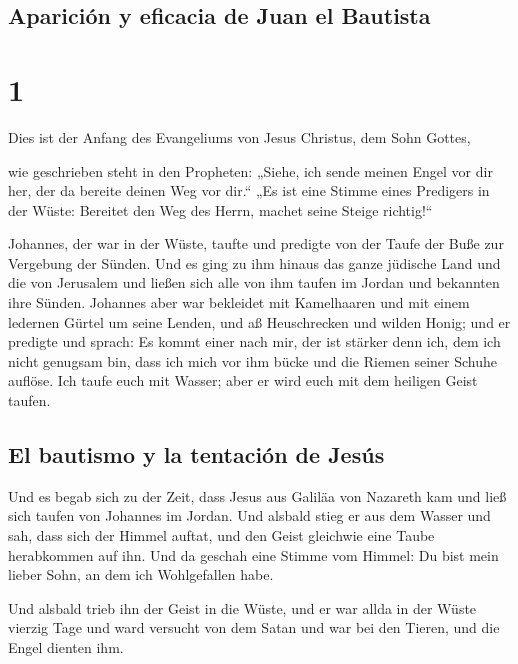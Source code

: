 \hypertarget{apariciuxf3n-y-eficacia-de-juan-el-bautista}{%
\subsection{Aparición y eficacia de Juan el
Bautista}\label{apariciuxf3n-y-eficacia-de-juan-el-bautista}}

\hypertarget{section}{%
\section{1}\label{section}}

 Dies ist der Anfang des Evangeliums von Jesus Christus,
dem Sohn Gottes,

 wie geschrieben steht in den Propheten: „Siehe, ich sende
meinen Engel vor dir her, der da bereite deinen Weg vor dir.``
 „Es ist eine Stimme eines Predigers in der Wüste:
Bereitet den Weg des Herrn, machet seine Steige richtig!{}``

 Johannes, der war in der Wüste, taufte und predigte von
der Taufe der Buße zur Vergebung der Sünden.  Und es ging
zu ihm hinaus das ganze jüdische Land und die von Jerusalem und ließen
sich alle von ihm taufen im Jordan und bekannten ihre Sünden.
 Johannes aber war bekleidet mit Kamelhaaren und mit einem
ledernen Gürtel um seine Lenden, und aß Heuschrecken und wilden Honig;
 und er predigte und sprach: Es kommt einer nach mir, der
ist stärker denn ich, dem ich nicht genugsam bin, dass ich mich vor ihm
bücke und die Riemen seiner Schuhe auflöse.  Ich taufe
euch mit Wasser; aber er wird euch mit dem heiligen Geist taufen.

\hypertarget{el-bautismo-y-la-tentaciuxf3n-de-jesuxfas}{%
\subsection{El bautismo y la tentación de
Jesús}\label{el-bautismo-y-la-tentaciuxf3n-de-jesuxfas}}

 Und es begab sich zu der Zeit, dass Jesus aus Galiläa von
Nazareth kam und ließ sich taufen von Johannes im Jordan.
 Und alsbald stieg er aus dem Wasser und sah, dass sich
der Himmel auftat, und den Geist gleichwie eine Taube herabkommen auf
ihn.  Und da geschah eine Stimme vom Himmel: Du bist mein
lieber Sohn, an dem ich Wohlgefallen habe.

 Und alsbald trieb ihn der Geist in die Wüste,
 und er war allda in der Wüste vierzig Tage und ward
versucht von dem Satan und war bei den Tieren, und die Engel dienten
ihm.


